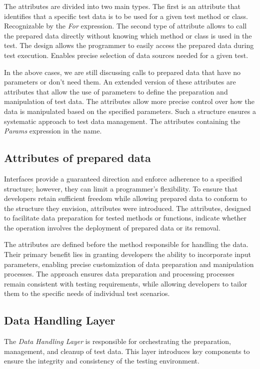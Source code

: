 The attributes are divided into two main types. The first is an attribute that identifies that a specific test data is to be used for a given test method or class. Recognizable by the \textit{For} expression. The second type of attribute allows to call the prepared data directly without knowing which method or class is used in the test. The design allows the programmer to easily access the prepared data during test execution. Enables precise selection of data sources needed for a given test.

In the above cases, we are still discussing calls to prepared data that have no parameters or don't need them. An extended version of these attributes are attributes that allow the use of parameters to define the preparation and manipulation of test data. The attributes allow more precise control over how the data is manipulated based on the specified parameters.  Such a structure ensures a systematic approach to test data management. The attributes containing the \textit{Params} expression in the name.

\subsection*{Attributes of prepared data}

Interfaces provide a guaranteed direction and enforce adherence to a specified structure; however, they can limit a programmer’s flexibility. To ensure that developers retain sufficient freedom while allowing prepared data to conform to the structure they envision, attributes were introduced. The attributes, designed to facilitate data preparation for tested methods or functions, indicate whether the operation involves the deployment of prepared data or its removal.

The attributes are defined before the method responsible for handling the data. Their primary benefit lies in granting developers the ability to incorporate input parameters, enabling precise customization of data preparation and manipulation processes.
The approach ensures data preparation and processing processes remain consistent with testing requirements, while allowing developers to tailor them to the specific needs of individual test scenarios.


\subsection{Data Handling Layer}
The \textit{Data Handling Layer} is responsible for orchestrating the preparation, management, and cleanup of test data. This layer introduces key components to ensure the integrity and consistency of the testing environment.

